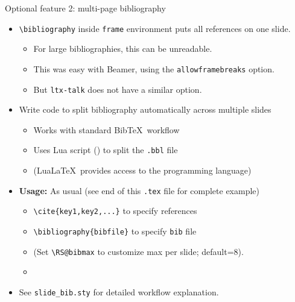 \begin{frame}{Optional feature 2: multi-page bibliography}

  \medskip
  
\begin{itemize}
\item \textbf{} \texttt{\textbackslash bibliography} inside \texttt{frame} environment puts all references on one slide.
  \begin{itemize}
  \item For large bibliographies, this can be unreadable.
  \item This was easy with Beamer, using the \texttt{allowframebreaks} option.
  \item But \texttt{ltx-talk} does not have a similar option.
  \end{itemize}

\bigskip

\item \textbf{} Write code to split bibliography automatically across multiple slides
  \begin{itemize}
  \item Works with standard Bib\TeX\ workflow
  \item Uses Lua script (\texttt{}) to split the \texttt{.bbl} file
  \item (Lua\LaTeX\ provides access to the  programming language)
  \end{itemize}

\bigskip

\item \textbf{Usage:} As usual (see end of this \texttt{.tex} file for complete example)
  \begin{itemize}
  \item \texttt{\textbackslash cite\{key1,key2,...\}} to specify references
  \item \texttt{\textbackslash bibliography\{bibfile\}} to specify \texttt{bib} file
  \item (Set \texttt{\textbackslash RS@bibmax} to customize max per slide; default=8).
  \item {}
    
  \end{itemize}

\bigskip

\item See \texttt{slide\_bib.sty} for detailed workflow explanation.
\end{itemize}
\end{frame}


